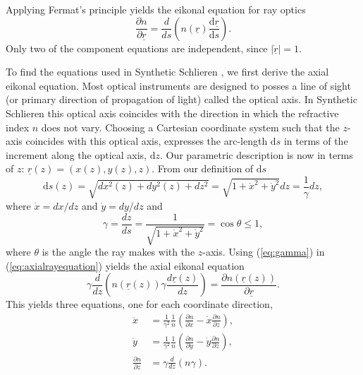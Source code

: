 \documentclass{article}
\begin{document}
Applying Fermat's principle \cite{holm2011geometric} yields the eikonal equation for ray optics
\begin{equation}
	\label{eq:axialrayequation}
	\frac{\partial n}{\partial \underline{r}} = \frac{d}{ds} \left(n(\underline{r}) \frac{\mathrm{d}\underline{r}}{\mathrm{d} s} \right).
\end{equation}
Only two of the component equations are independent, since $|\dot{\underline{r}}| = 1$.
 
To find the equations used in Synthetic Schlieren \cite{weyl1954analysis,dalziel2000whole}, we first derive the axial eikonal equation. Most optical instruments are designed to posses a line of sight (or primary direction of propagation of light) called the optical axis. In Synthetic Schlieren this optical axis coincides with the direction in which the refractive index $n$ does not vary. Choosing a Cartesian coordinate system such that the $z$-axis coincides with this optical axis, expresses the arc-length $\mathrm{d}s$ in terms of the increment along the optical axis, $\mathrm{d}z$. Our parametric description is now in terms of $z$: $\underline{r}(z) = (x(z), y(z), z)$. From our definition of $\mathrm{d}s$
\begin{equation}
	\mathrm{d}s(z) = \sqrt{dx^2(z) + dy^2(z) + dz^2} = \sqrt{1+\dot{x}^2 +\dot{y}^2} d z = \frac{1}{\gamma} d z,
\end{equation}
where $\dot{x} = d x / dz$ and $\dot{y} = dy/dz$ and 
\begin{equation}
	\label{eq:gamma}
	\gamma = \frac{d z}{d s} = \frac{1}{\sqrt{1+\dot{x}^2+\dot{y}^2}} = \cos \theta\leq 1,
\end{equation}
where $\theta$ is the angle the ray makes with the $z$-axis. Using (\ref{eq:gamma}) in (\ref{eq:axialrayequation}) yields the axial eikonal equation %
\begin{equation}
	\gamma \frac{d}{dz} \left(n(\underline{r}(z)) \gamma \frac{d \underline{r}(z)}{d z} \right)  = \frac{\partial n(\underline{r}(z))}{\partial \underline{r}}.
\end{equation}
This yields three equations, one for each coordinate direction,
\begin{equation}
	\label{eq:axraycoord}
	\begin{aligned}
		\ddot{x}  &= \frac{1}{\gamma^2} \frac{1}{n} \left(\frac{\partial n}{\partial x} - \dot{x} \frac{\partial n}{\partial z} \right), \\
		\ddot{y} &= \frac{1}{\gamma^2} \frac{1}{n} \left(\frac{\partial n}{\partial y} - \dot{y} \frac{\partial n}{\partial z} \right), \\
		\frac{\partial n}{\partial z} &= \gamma \frac{d}{dz}\left(n  \gamma\right).
	\end{aligned}
\end{equation}	
\end{document}
